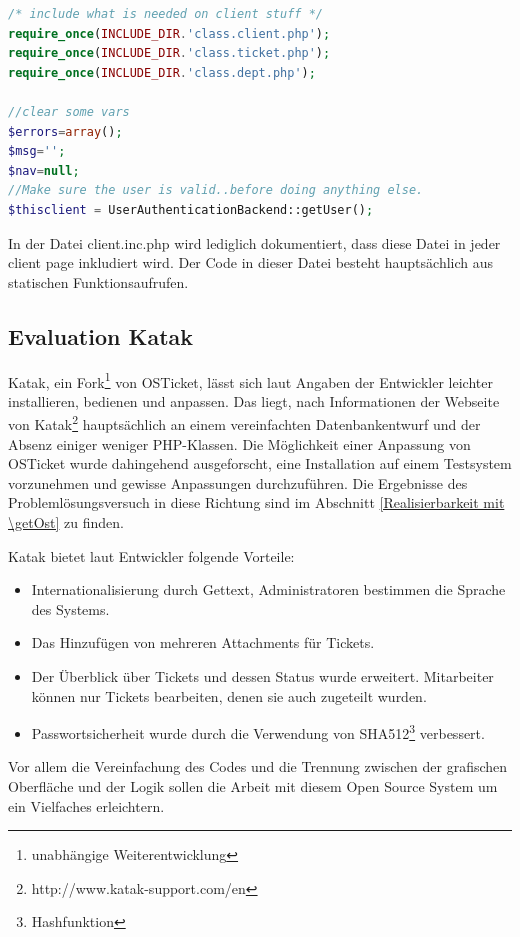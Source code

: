 \begin{lstlisting}[language=PHP, caption=client.inc.php, firstnumber=38]
/* include what is needed on client stuff */
require_once(INCLUDE_DIR.'class.client.php');
require_once(INCLUDE_DIR.'class.ticket.php');
require_once(INCLUDE_DIR.'class.dept.php');

//clear some vars
$errors=array();
$msg='';
$nav=null;
//Make sure the user is valid..before doing anything else.
$thisclient = UserAuthenticationBackend::getUser();
\end{lstlisting}
In der Datei client.inc.php wird lediglich dokumentiert, dass diese Datei in jeder client page inkludiert wird. Der Code in dieser Datei besteht hauptsächlich aus statischen Funktionsaufrufen.

\subsection{Evaluation Katak}
Katak, ein Fork\footnote{unabhängige Weiterentwicklung} von OSTicket, lässt sich laut Angaben der Entwickler leichter installieren, bedienen und anpassen. Das liegt, nach Informationen der Webseite von Katak\footnote{http://www.katak-support.com/en} hauptsächlich an einem vereinfachten Datenbankentwurf und der Absenz einiger weniger PHP-Klassen. Die Möglichkeit einer Anpassung von OSTicket wurde dahingehend ausgeforscht, eine Installation auf einem Testsystem vorzunehmen und gewisse Anpassungen durchzuführen. Die Ergebnisse des Problemlösungsversuch in diese Richtung sind im Abschnitt \ref{Realisierbarkeit mit \getOst} zu finden.

Katak bietet laut Entwickler folgende Vorteile:
\begin{itemize}
	\item Internationalisierung durch Gettext, Administratoren bestimmen die Sprache des Systems.
	\item Das Hinzufügen von mehreren Attachments für Tickets.
	\item Der Überblick über Tickets und dessen Status wurde erweitert. Mitarbeiter können nur Tickets bearbeiten, denen sie auch zugeteilt wurden.
	\item Passwortsicherheit wurde durch die Verwendung von SHA512\footnote{Hashfunktion} verbessert.
\end{itemize}
Vor allem die Vereinfachung des Codes und die Trennung zwischen der grafischen Oberfläche und der Logik sollen die Arbeit mit diesem Open Source System um ein Vielfaches erleichtern.
\newpage

